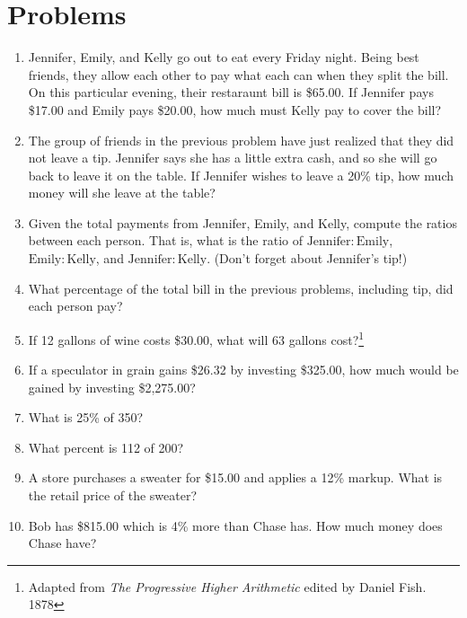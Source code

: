 \documentclass{article}
\begin{document}
\section*{Problems}
\begin{enumerate}
\item Jennifer, Emily, and Kelly go out to eat every Friday night.  Being best friends, they allow each other to pay what 
each can when they split the bill.  On this particular evening, 
their restaraunt bill is \$65.00.  If Jennifer pays \$17.00 and Emily pays \$20.00, how much must Kelly pay to cover the bill?

\item The group of friends in the previous problem have just realized that they did not leave a tip.  Jennifer says she has a little extra cash, and so she will go back to leave it on the table.  If Jennifer wishes to leave a 20\% tip, how much money 
will she leave at the table?

\item Given the total payments from Jennifer, Emily, and Kelly, compute the ratios between each person.  That is, what is the ratio of $\mathrm{Jennifer} : \mathrm{Emily}$, $\mathrm{Emily}:\mathrm{Kelly}$, and $\mathrm{Jennifer}:\mathrm{Kelly}$.  
(Don't forget about Jennifer's tip!)

\item What percentage of the total bill in the previous problems, including tip, did each person pay?

\item If 12 gallons of wine costs \$30.00, what will 63 gallons cost?\footnote{Adapted from {\em The Progressive Higher Arithmetic} edited by Daniel Fish. 1878\label{fn:higher}}

\item If a speculator in grain gains \$26.32 by investing 
\$325.00, how much would be gained by investing \$2,275.00?\footnotemark[\ref{fn:higher}]

\item What is 25\% of 350?

\item What percent is 112 of 200?

\item A store purchases a sweater for \$15.00 and applies a 12\% markup.  What is the retail price of the sweater?

\item Bob has \$815.00 which is 4\% more than Chase has.  How much money does Chase have?\footnotemark[\ref{fn:higher}]


\end{enumerate}
\end{document}
